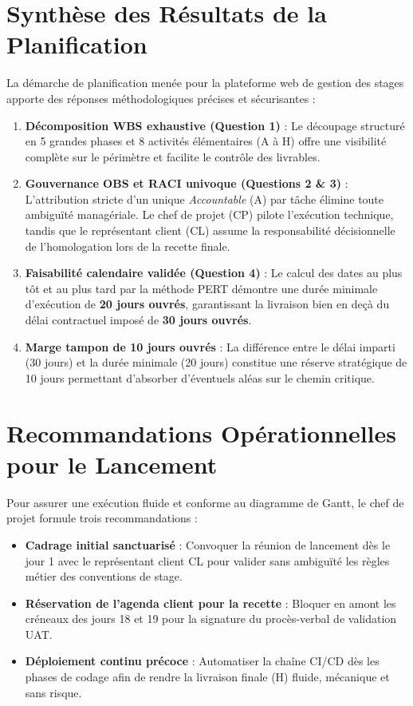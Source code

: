 \documentclass[a4paper,12pt]{report}
\begin{document}
	\section{Synthèse des Résultats de la Planification}
	La démarche de planification menée pour la plateforme web de gestion des stages apporte des réponses méthodologiques précises et sécurisantes :
	\begin{enumerate}[leftmargin=1.0cm, noitemsep, topsep=2pt]
		\item \textbf{Décomposition WBS exhaustive (Question 1)} : Le découpage structuré en 5 grandes phases et 8 activités élémentaires (A à H) offre une visibilité complète sur le périmètre et facilite le contrôle des livrables.
		\item \textbf{Gouvernance OBS et RACI univoque (Questions 2 \& 3)} : L'attribution stricte d'un unique \textit{Accountable} (A) par tâche élimine toute ambiguïté managériale. Le chef de projet (CP) pilote l'exécution technique, tandis que le représentant client (CL) assume la responsabilité décisionnelle de l'homologation lors de la recette finale.
		\item \textbf{Faisabilité calendaire validée (Question 4)} : Le calcul des dates au plus tôt et au plus tard par la méthode PERT démontre une durée minimale d'exécution de \textbf{20 jours ouvrés}, garantissant la livraison bien en deçà du délai contractuel imposé de \textbf{30 jours ouvrés}.
		\item \textbf{Marge tampon de 10 jours ouvrés} : La différence entre le délai imparti (30 jours) et la durée minimale (20 jours) constitue une réserve stratégique de 10 jours permettant d'absorber d'éventuels aléas sur le chemin critique.
	\end{enumerate}
	
	\section{Recommandations Opérationnelles pour le Lancement}
	Pour assurer une exécution fluide et conforme au diagramme de Gantt, le chef de projet formule trois recommandations :
	\begin{itemize}[leftmargin=1.0cm, noitemsep, topsep=2pt]
		\item \textbf{Cadrage initial sanctuarisé} : Convoquer la réunion de lancement dès le jour 1 avec le représentant client CL pour valider sans ambiguïté les règles métier des conventions de stage.
		\item \textbf{Réservation de l'agenda client pour la recette} : Bloquer en amont les créneaux des jours 18 et 19 pour la signature du procès-verbal de validation UAT.
		\item \textbf{Déploiement continu précoce} : Automatiser la chaîne CI/CD dès les phases de codage afin de rendre la livraison finale (H) fluide, mécanique et sans risque.
	\end{itemize}
\end{document}
